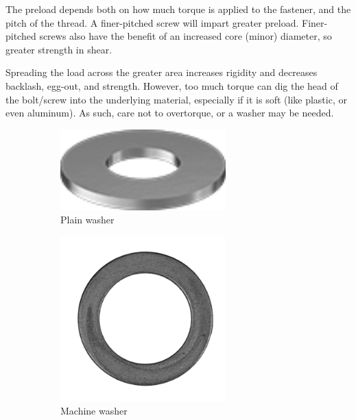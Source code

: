 \documentclass[10pt,letterpaper]{book}
\begin{document}
	The preload depends both on how much torque is applied to the fastener, and the pitch of the thread. A finer-pitched screw will impart greater preload. Finer-pitched screws also have the benefit of an increased core (minor) diameter, so greater strength in shear.
	
	Spreading the load across the greater area increases rigidity and decreases backlash, egg-out, and strength. However, too much torque can dig the head of the bolt/screw into the underlying material, especially if it is soft (like plastic, or even aluminum). As such, care not to overtorque, or a washer may be needed.
	
	\begin{figure}[H]
		\centering
		\begin{subfigure}[b]{.24\linewidth}
			\includegraphics[width=0.7\textwidth]{imgs/plainwasher.png}
			\caption{Plain washer}
		\end{subfigure}\begin{subfigure}[b]{.24\linewidth}
			\includegraphics[width=0.7\textwidth]{imgs/machinewasher.png}
			\caption{Machine washer}
		\end{subfigure}\begin{subfigure}[b]{.24\linewidth}

\end{subfigure}
\end{figure}
\end{document}
